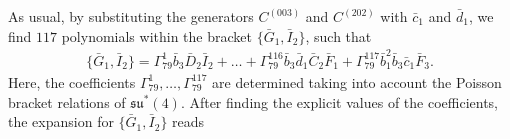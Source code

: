 \documentclass[10pt]{amsart}
\theoremstyle{definition}
\theoremstyle{corollary}
\theoremstyle{remark}
\theoremstyle{conclusion}
\begin{document}
As usual, by substituting the generators $C^{(003)}$ and $C^{(202)}$ with $\bar{c}_1$ and $\bar{d}_1$, we find $117$ polynomials within the bracket $ \{\bar{G}_1,\bar{I}_2\}$, such that  
\begin{align*}
    \{\bar{G}_1, \bar{I}_2\} = \Gamma_{79}^1  \bar{b}_3 \bar{D}_2 \bar{I}_2 + \ldots + \Gamma_{79}^{116} \bar{b}_3 \bar{d}_1  \bar{C}_2  \bar{F}_1 + \Gamma_{79}^{117} \bar{b}_1^2 \bar{b}_3 \bar{c}_1 \bar{F}_3.
\end{align*} Here, the coefficients $\Gamma_{79}^1,\ldots,\Gamma_{79}^{117}$ are determined taking into account the  Poisson bracket relations of $\mathfrak{su}^*(4)$.  After finding the explicit values of the coefficients, the  expansion for $\{\bar{G}_1, \bar{I}_2\}$ reads  
\end{document}
